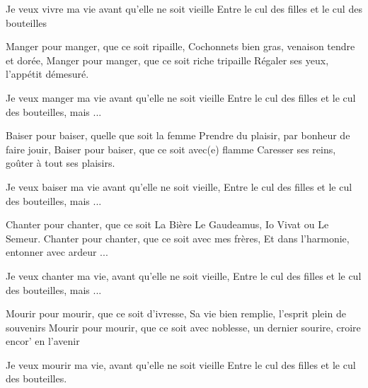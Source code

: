 \footnotemark [
ititle={Vivre pour vivre},
tu={D'après le film "Mon oncle Benjamin"}]


\beginchorus
Je veux vivre ma vie avant qu'elle ne soit vieille
Entre le cul des filles et le cul des bouteilles
\endchorus

\beginverse
Manger pour manger, que ce soit ripaille,
Cochonnets bien gras, venaison tendre et dorée,
Manger pour manger, que ce soit riche tripaille
Régaler ses yeux, l'appétit démesuré.
\endverse

\beginchorus
Je veux manger ma vie avant qu'elle ne soit vieille
Entre le cul des filles et le cul des bouteilles, mais ...
\endchorus

\beginverse
Baiser pour baiser, quelle que soit la femme
Prendre du plaisir, par bonheur de faire jouir,
Baiser pour baiser, que ce soit avec(e) flamme
Caresser ses reins, goûter à tout ses plaisirs.
\endverse

\beginchorus
Je veux baiser ma vie avant qu'elle ne soit vieille,
Entre le cul des filles et le cul des bouteilles, mais ...
\endchorus

\beginverse
Chanter pour chanter, que ce soit La Bière
Le Gaudeamus, Io Vivat ou Le Semeur.
Chanter pour chanter, que ce soit avec mes frères,
Et dans l'harmonie, entonner avec ardeur ...
\endverse

\beginchorus
Je veux chanter ma vie, avant qu'elle ne soit vieille,
Entre le cul des filles et le cul des bouteilles, mais ...
\endchorus

\beginverse
Mourir pour mourir, que ce soit d'ivresse,
Sa vie bien remplie, l'esprit plein de souvenirs
Mourir pour mourir, que ce soit avec noblesse,
un dernier sourire, croire encor' en l'avenir
\endverse

\beginchorus
Je veux mourir ma vie, avant qu'elle ne soit vieille
Entre le cul des filles et le cul des bouteilles.
\endchorus
\endsong